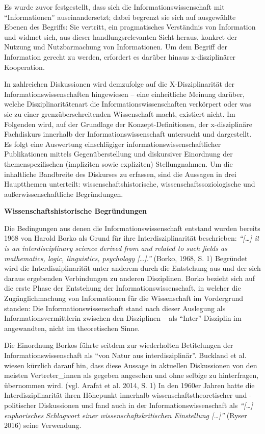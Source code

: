 \documentclass[a4paper,
fontsize=11pt,
oneside,
numbers=noperiodatend,
parskip=half-,
bibliography=totoc,
final
]{scrartcl}
\begin{document}
Es wurde zuvor festgestellt, dass sich die Informationswissenschaft mit
\enquote{Informationen} auseinandersetzt; dabei begrenzt sie sich auf
ausgewählte Ebenen des Begriffs: Sie vertritt, ein pragmatisches
Verständnis von Information und widmet sich, aus dieser
handlungsrelevanten Sicht heraus, konkret der Nutzung und Nutzbarmachung
von Informationen. Um dem Begriff der Information gerecht zu werden,
erfordert es darüber hinaus x-disziplinärer Kooperation.

In zahlreichen Diskussionen wird demzufolge auf die X-Disziplinarität
der Informationswissenschaften hingewiesen -- eine einheitliche Meinung
darüber, welche Disziplinaritätenart die Informationswissenschaften
verkörpert oder was sie zu einer grenzüberschreitenden Wissenschaft
macht, existiert nicht. Im Folgenden wird, auf der Grundlage der
Konzept-Definitionen, der x-disziplinäre Fachdiskurs innerhalb der
Informationswissenschaft untersucht und dargestellt. Es folgt eine
Auswertung einschlägiger informationswissenschaftlicher Publikationen
mittels Gegenüberstellung und diskursiver Einordnung der
themenspezifischen (impliziten sowie expliziten) Stellungnahmen. Um die
inhaltliche Bandbreite des Diskurses zu erfassen, sind die Aussagen in
drei Hauptthemen unterteilt: wissenschaftshistorische,
wissenschaftssoziologische und außerwissenschaftliche Begründungen.

\textbf{Wissenschaftshistorische Begründungen}

Die Bedingungen aus denen die Informationswissenschaft entstand wurden
bereits 1968 von Harold Borko als Grund für ihre Interdisziplinarität
beschrieben: \emph{\enquote{{[}\ldots{}{]} it is an interdisciplinary
science derived from and related to such fields as mathematics, logic,
linguistics, psychology {[}\ldots{}{]}.}} (Borko, 1968, S. 1) Begründet
wird die Interdisziplinarität unter anderem durch die Entstehung aus und
der sich daraus ergebenden Verbindungen zu anderen Disziplinen. Borko
bezieht sich auf die erste Phase der Entstehung der
Informationswissenschaft, in welcher die Zugänglichmachung von
Informationen für die Wissenschaft im Vordergrund standen: Die
Informationswissenschaft stand nach dieser Auslegung als
Informationsvermittlerin zwischen den Disziplinen -- als
\enquote{Inter}-Disziplin im angewandten, nicht im theoretischen Sinne.

Die Einordnung Borkos führte seitdem zur wiederholten Betitelungen der
Informationswissenschaft als \enquote{von Natur aus interdisziplinär}.
Buckland et al. wiesen kürzlich darauf hin, dass diese Aussage in
aktuellen Diskussionen von den meisten Vertreter\_innen als gegeben
angesehen und ohne selbige zu hinterfragen, übernommen wird. (vgl.
Arafat et al. 2014, S. 1) In den 1960er Jahren hatte die
Interdisziplinarität ihren Höhepunkt innerhalb
wissenschaftstheoretischer und -politischer Diskussionen und fand auch
in der Informationswissenschaft als \emph{\enquote{{[}\ldots{}{]}
euphorisches Schlagwort einer wissenschaftskritischen Einstellung
{[}\ldots{}{]}}} (Ryser 2016) seine Verwendung.
\end{document}
